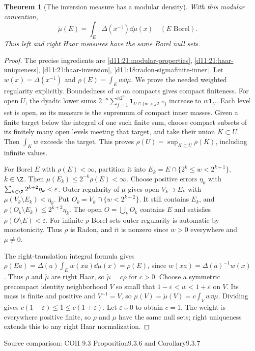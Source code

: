 \documentclass[11pt,oneside,openany]{book}
\newtheorem{theorem}{Theorem}[chapter]
\theoremstyle{definition}
\theoremstyle{remark}
\newcommand{\eps}{\varepsilon}\newcommand{\ee}{\varepsilon}
\newcommand{\one}{\mathbf1}\newcommand{\ind}[1]{\mathbf1_{#1}}
\newcommand{\family}[1]{}
\newcommand{\source}[1]{\par\begingroup\small\sffamily\color{black!65}Source comparison: #1\par\endgroup}
\begin{document}
\begin{theorem}[The inversion measure has a modular density]\family{D11.21.left_right_density}\label{d11:21:left-right-density}
With this modular convention,
\[\check\mu(E)=\int_E\Delta(x^{-1})\dd\mu(x)\quad(E\text{ Borel}).\]
Thus left and right Haar measures have the same Borel null sets.
\end{theorem}
\begin{proof}
The precise ingredients are \cref{d11:21:modular-properties}, \cref{d11:21:haar-uniqueness}, \cref{d11:21:haar-inversion}, \cref{d11:18:radon-sigmafinite-inner}. Let $w(x)=\Delta(x^{-1})$ and $\rho(E)=\int_Ew\dd\mu$. We prove the needed weighted regularity explicitly. Boundedness of $w$ on compacts gives compact finiteness. For open $U$, the dyadic lower sums
$2^{-n}\sum_{j=1}^{n2^n}\one_{U\cap\{w>j2^{-n}\}}$
increase to $w\one_U$. Each level set is open, so its measure is the supremum of compact inner masses. Given a finite target below the integral of one such finite sum, choose compact subsets of its finitely many open levels meeting that target, and take their union $K\subset U$. Then $\int_Kw$ exceeds the target. This proves $\rho(U)=\sup_{K\subset U}\rho(K)$, including infinite values.

For Borel $E$ with $\rho(E)<\infty$, partition it into $E_k=E\cap\{2^k\le w<2^{k+1}\}$, $k\in\Z$. Then $\mu(E_k)\le2^{-k}\rho(E)<\infty$. Choose positive errors $\eta_k$ with $\sum_{k\in\Z}2^{k+2}\eta_k<\eps$. Outer regularity of $\mu$ gives open $V_k\supset E_k$ with $\mu(V_k\setminus E_k)<\eta_k$. Put $O_k=V_k\cap\{w<2^{k+2}\}$. It still contains $E_k$, and
$\rho(O_k\setminus E_k)\le2^{k+2}\eta_k$.
The open $O=\bigcup_kO_k$ contains $E$ and satisfies $\rho(O\setminus E)<\eps$. For infinite-$\rho$ Borel sets outer regularity is automatic by monotonicity. Thus $\rho$ is Radon, and it is nonzero since $w>0$ everywhere and $\mu\ne0$.

The right-translation integral formula gives $\rho(Ea)=\Delta(a)\int_E w(xa)\dd\mu(x)=\rho(E)$, since $w(xa)=\Delta(a)^{-1}w(x)$. Thus $\rho$ and $\check\mu$ are right Haar, so $\check\mu=c\rho$ for $c>0$. Choose a symmetric precompact identity neighborhood $V$ so small that $1-\eps<w<1+\eps$ on $V$. Its mass is finite and positive and $V^{-1}=V$, so
$\mu(V)=\check\mu(V)=c\int_Vw\dd\mu$.
Dividing gives $c(1-\eps)\le1\le c(1+\eps)$. Let $\eps\downarrow0$ to obtain $c=1$. The weight is everywhere positive finite, so $\rho$ and $\mu$ have the same null sets; right uniqueness extends this to any right Haar normalization.
\end{proof}
\source{COH 9.3 Proposition9.3.6 and Corollary9.3.7}
\end{document}

